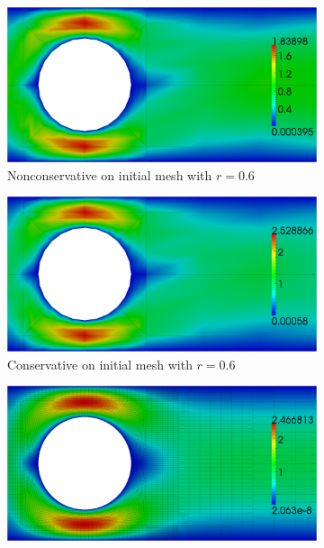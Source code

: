 \documentclass[Proposal.tex]{subfiles}
\begin{document}
\begin{figure}[p]
\centering
\begin{subfigure}[t]{0.45\textwidth}
\centering
\includegraphics[width=\textwidth]{figs/StokesCylinder/umag6_NC0.png}
\caption{Nonconservative on initial mesh with $r=0.6$}
\label{fig:stokesCylinder6NC0}
\end{subfigure}
\begin{subfigure}[t]{0.45\textwidth}
\centering
\includegraphics[width=\textwidth]{figs/StokesCylinder/umag6_C0.png}
\caption{Conservative on initial mesh with $r=0.6$}
\label{fig:stokesCylinder6C0}
\end{subfigure}
\begin{subfigure}[t]{0.45\textwidth}
\centering
\includegraphics[width=\textwidth]{figs/StokesCylinder/umag6_NC6.png}

\end{subfigure}
\end{figure}
\end{document}
